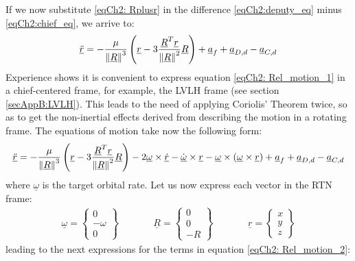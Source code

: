 	\indent If we now substitute \eqref{eqCh2: 	Rplusr} in the difference \eqref{eqCh2:deputy_eq} minus \eqref{eqCh2:chief_eq}, we arrive to:
	\begin{equation}
	\underline{\ddot{r}} = - \dfrac{\mu}{\mbox{$\left\lVert \underline{R} \right\rVert$}^3} \left(\underline{r} - 3 \dfrac{\underline{R}^T \underline{r}}{\mbox{$\left\lVert \underline{R} \right\rVert$}^2} \underline{R} \right) + \underline{a}_f + \underline{a}_{D, d} - \underline{a}_{C, d}
	\label{eqCh2: 	Rel_motion_1}
	\end{equation}
	\indent Experience shows it is convenient to express equation \eqref{eqCh2: 	Rel_motion_1} in a chief-centered frame, for example, the LVLH frame (see section \ref{secAppB:LVLH}). This leads to the need of applying Coriolis' Theorem twice, so as to get the non-inertial effects derived from describing the motion in a rotating frame. The equations of motion take now the following form:
	\begin{equation}
	\underline{\ddot{r}} = - \dfrac{\mu}{\mbox{$\left\lVert \underline{R} \right\rVert$}^3} \left(\underline{r} - 3 \dfrac{\underline{R}^T \underline{r}}{\mbox{$\left\lVert \underline{R} \right\rVert$}^2} \underline{R} \right) - 2 \underline{\omega}\times  \underline{\dot{r}} - \underline{\dot{\omega}}\times \underline{r} - \underline{\omega}\times \left( \underline{\omega} \times \underline{r}\right) + \underline{a}_f + \underline{a}_{D, d} - \underline{a}_{C, d}
	\label{eqCh2: 	Rel_motion_2}
	\end{equation}
	\noindent where $\underline{\omega}$ is the target orbital rate. Let us now express each vector in the RTN frame:
	\begin{align}
	\underline{\omega} = 
	\left\{ \begin{array}{c}
	0 \\
	-\omega \\
	0
	\end{array}\right\} 
	& \qquad &
	\underline{R} = 
	\left\{ \begin{array}{c}
	0 \\
	0 \\
	-R
	\end{array}\right\} 
	& \qquad &
	\underline{r} = 
	\left\{ \begin{array}{c}
	x \\
	y \\
	z
	\end{array}\right\} 
	\end{align}
	\noindent leading to the next expressions for the terms in equation \eqref{eqCh2: 	Rel_motion_2}:
